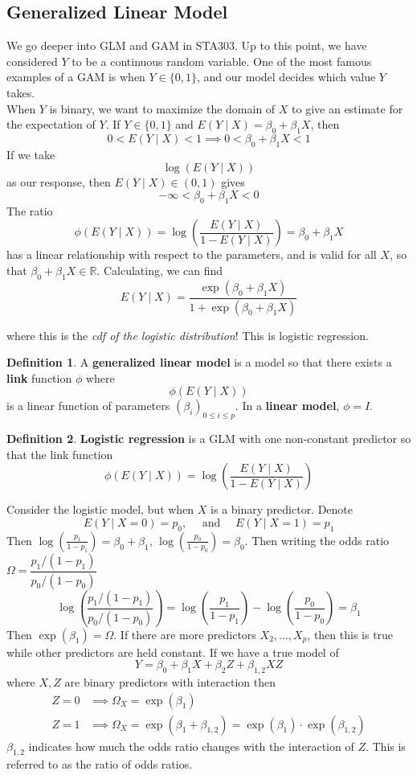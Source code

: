 \documentclass[12pt, a4paper]{article}
\theoremstyle{definition}
\newtheorem{definition}{Definition}
\newcommand{\R}{\mathbb{R}}                           %
\newcommand{\imp}{\implies}
\newcommand{\f}{\frac}
\newcommand{\df}{\dfrac}
\newcommand{\BB}[1]{\left(#1\right)}
\begin{document}
	\subsection{Generalized Linear Model}
	
	We go deeper into GLM and GAM in STA303. Up to this point, we have considered $Y$ to be a continuous random variable. One of the most famous examples of a GAM is when $Y \in \{0,1\}$, and our model decides which value $Y$ takes.\\
	
	When $Y$ is binary, we want to maximize the domain of $X$ to give an estimate for the expectation of $Y$. If $Y \in \{0,1\}$ and $E(Y \mid X) = \beta_0 + \beta_1 X$, then 
	$$0<E(Y \mid X) < 1 \imp 0 < \beta_0 + \beta_1 X < 1$$
	If we take 
	$$\log(E(Y \mid X))$$ as our response, then 
	$E(Y\mid X) \in (0,1)$ gives 
	$$-\infty < \beta_0 + \beta_1 X < 0$$
	The ratio 
	$$\phi (E(Y\mid X)) = \log \BB{\f{E(Y\mid X)}{1 - E(Y \mid X)}} = \beta_0 + \beta_1 X$$ 
	has a linear relationship with respect to the parameters, and is valid for all $X$, so that  $\beta_0 + \beta_1 X \in \R$.  Calculating, we can find
	$$
		E(Y \mid X) = \f{\exp(\beta_0 + \beta_1 X)}{1 + \exp(\beta_0 + \beta_1X)}
	$$

	where this is the \textit{cdf of the logistic distribution}! This is  logistic regression. 
	\begin{definition}
		A {\bf generalized linear model} is a model so that there exists a {\bf link} function $\phi$ where $$\phi(E(Y \mid X))$$ is a linear function of parameters $(\beta_i)_{0 \leq i \leq p}$. In a {\bf linear model}, $\phi = I$. 
	\end{definition}
	\begin{definition}
		{\bf Logistic regression} is a GLM with one non-constant predictor so that the link function
		$$
			\phi (E(Y\mid X)) = \log \BB{\f{E(Y\mid X)}{1 - E(Y \mid X)}}
		$$
	\end{definition}
	Consider the logistic model, but when $X$ is a binary predictor. Denote 
	$$E(Y \mid X = 0) = p_0, \quad \text{ and } \quad E(Y \mid X = 1) = p_1$$
	Then $\log(\f{p_1}{1-p_1}) = \beta_0 + \beta_1,\, \log(\f{p_0}{1-p_0}) = \beta_0$. Then writing the odds ratio $\Omega = \df{p_1/(1-p_1)}{p_0/(1-p_0)}$
	$$
		\log\BB{\f{p_1/(1-p_1)}{p_0/(1-p_0)}} = \log\BB{\f{p_1}{1-p_1}} - \log\BB{\f{p_0}{1-p_0}} = \beta_1
	$$
	Then $\exp(\beta_1) = \Omega$. If there are more predictors $X_2,\ldots, X_p$, then this is true while other predictors are held constant. If we have a true model of $$Y = \beta_0 + \beta_1 X + \beta_2Z + \beta_{1,2}XZ$$
	 where $X,Z$ are binary predictors with interaction then 
	\begin{align*}
		Z = 0 &\imp \Omega_X = \exp(\beta_1) \\
		Z = 1 &\imp \Omega_X = \exp(\beta_1 + \beta_{1,2})  = \exp(\beta_1) \cdot \exp(\beta_{1,2})
	\end{align*}
	$\beta_{1,2}$ indicates how much the odds ratio changes with the interaction of $Z$. This is referred to as the ratio of odds ratios.
		
\end{document}
